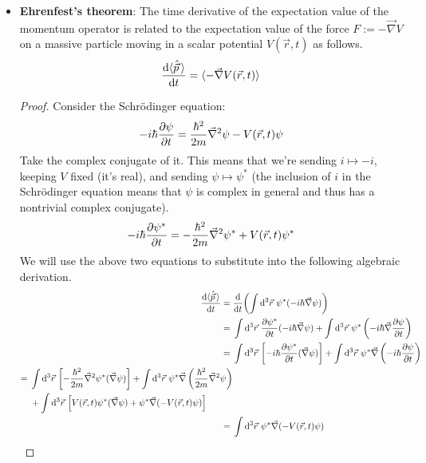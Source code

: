\documentclass[../notes.tex]{subfiles}
\begin{document}
\begin{itemize}
    \item \textbf{Ehrenfest's theorem}: The time derivative of the expectation value of the momentum operator is related to the expectation value of the force $F:=-\vec{\nabla}V$ on a massive particle moving in a scalar potential $V(\vec{r},t)$ as follows.
    \begin{equation*}
        \dv{\langle{\hat{\vec{p}}\,}\rangle}{t} = \langle{-\vec{\nabla}V(\vec{r},t)}\rangle
    \end{equation*}
    \begin{proof}
        Consider the Schr\"{o}dinger equation:
        \begin{equation*}
            -i\hbar\pdv{\psi}{t} = \frac{\hbar^2}{2m}\vec{\nabla}^2\psi-V(\vec{r},t)\psi
        \end{equation*}
        Take the complex conjugate of it. This means that we're sending $i\mapsto -i$, keeping $V$ fixed (it's real), and sending $\psi\mapsto\psi^*$ (the inclusion of $i$ in the Schr\"{o}dinger equation means that $\psi$ is complex in general and thus has a nontrivial complex conjugate).
        \begin{equation*}
            -i\hbar\pdv{\psi^*}{t} = -\frac{\hbar^2}{2m}\vec{\nabla}^2\psi^*+V(\vec{r},t)\psi^*
        \end{equation*}
        We will use the above two equations to substitute into the following algebraic derivation.
        \begin{align*}
            \dv{\Exp{\hat{\vec{p}}\,}}{t} ={}& \dv{t}(\int\dd^3\vec{r}\ \psi^*(-i\hbar\vec{\nabla}\psi))\\
            ={}& \int\dd^3\vec{r}\ {\pdv{\psi^*}{t}}(-i\hbar\vec{\nabla}\psi)+\int\dd^3\vec{r}\ \psi^*\left( -i\hbar\vec{\nabla}\pdv{\psi}{t} \right)\\
            ={}& \int\dd^3\vec{r}\,\left[ -i\hbar{\pdv{\psi^*}{t}}(\vec{\nabla}\psi) \right]+\int\dd^3\vec{r}\ \psi^*\vec{\nabla}\left( -i\hbar\pdv{\psi}{t} \right)\\
            \begin{split}
                ={}& \int\dd^3\vec{r}\,\left[ -\frac{\hbar^2}{2m}\vec{\nabla}^2\psi^*(\vec{\nabla}\psi) \right]+\int\dd^3\vec{r}\ \psi^*\vec{\nabla}\left( \frac{\hbar^2}{2m}\vec{\nabla}^2\psi \right)\\
                & +\int\dd^3\vec{r}\,\left[ V(\vec{r},t)\psi^*(\vec{\nabla}\psi)+\psi^*\vec{\nabla}(-V(\vec{r},t)\psi) \right]
            \end{split}\\
            ={}& \int\dd^3\vec{r}\ \psi^*\vec{\nabla}(-V(\vec{r},t)\psi)\\

\end{align*}
\end{proof}
\end{itemize}
\end{document}
